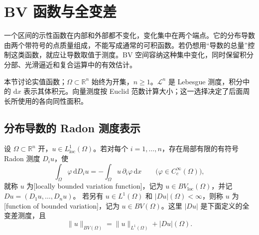 
% 
% 

\section{BV 函数与全变差}
\label{g3:sec:2101}

一个区间的示性函数在内部和外部都不变化，变化集中在两个端点。它的分布导数由两个带符号的点质量组成，不能写成通常的可积函数。若仍想用“导数的总量”控制这类函数，就应让导数取值于测度。BV 空间容纳这种集中变化，同时保留积分分部、光滑逼近和复合运算中的有效估计。

\ProseParagraphBreak
本节讨论实值函数；\(\Omega\subset\mathbb R^n\) 始终为开集，\(n\ge1\)。\(\mathcal L^n\) 是 Lebesgue 测度，积分中的 \(\mathrm dx\) 表示其体积元。向量测度按 Euclid 范数计算大小；这一选择决定了后面周长所使用的各向同性面积。

\subsection{分布导数的 Radon 测度表示}
\label{g3:subsec:2101:01}
\begin{definition}\label{g3:def:bv-function}
	设 \(\Omega\subset\mathbb R^n\) 开，\(u\in L^1_{\mathrm{loc}}(\Omega)\)。若对每个 \(i=1,\ldots,n\)，存在局部有限的有符号 Radon 测度 \(D_i u\)，使
	\begin{equation}\label{g3:eq:bv-distributional-derivative}
		\int_\Omega\varphi\,\mathrm dD_i u
		=-\int_\Omega u\,\partial_i\varphi\,\mathrm dx
		\qquad\bigl(\varphi\in C_c^\infty(\Omega)\bigr),
	\end{equation}
	就称 \(u\) 为[locally bounded variation function]，记为 \(u\in BV_{\mathrm{loc}}(\Omega)\)，并记 \(Du=(D_1u,\ldots,D_nu)\)。
	若另有 \(u\in L^1(\Omega)\) 和 \(|Du|(\Omega)<\infty\)，则称 \(u\) 为[function of bounded variation]，记为 \(u\in BV(\Omega)\)。这里 \(|Du|\) 是下面定义的全变差测度，且
	\[
		\|u\|_{BV(\Omega)}=\|u\|_{L^1(\Omega)}+|Du|(\Omega).
	\]
\end{definition}

